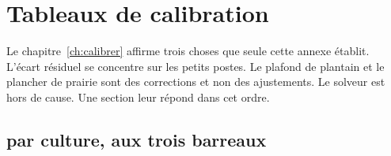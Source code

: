 \chapter{Tableaux de calibration}
\label{ann:calibration}

Le chapitre~\ref{ch:calibrer} affirme trois choses que seule cette annexe établit. L'écart
résiduel se concentre sur les petits postes. Le plafond de plantain et le plancher de prairie
sont des corrections et non des ajustements. Le solveur est hors de cause. Une section leur
répond dans cet ordre.

\section{ par culture, aux trois barreaux}

